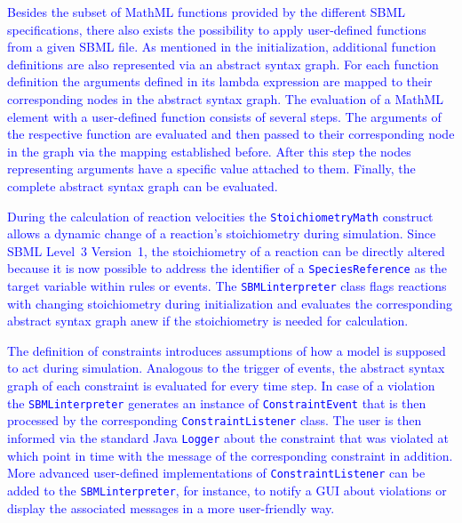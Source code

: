 \documentclass[10pt]{bmc_article}
\newenvironment{bmcformat}{\fussy\setboolean{publ}{true}}{\fussy}
\newcommand{\ConstraintEvent}             {\texttt{Constraint\-Event}\xspace}
\newcommand{\ConstraintListener}          {\texttt{Constraint\-Listener}\xspace}
\newcommand{\COR}[1]                      {\textcolor{blue}{#1}}
\newcommand{\Logger}                      {\texttt{Logger}\xspace}
\newcommand{\SBMLinterpreter}             {\texttt{SBML\-interpreter}\xspace}
\newcommand{\SpeciesReference}            {\texttt{Spe\-ci\-es\-Re\-fe\-ren\-ce}\xspace}
\newcommand{\StoichiometryMath}           {\texttt{Stoi\-chio\-metry\-Math}\xspace}
\begin{document}
\begin{bmcformat}
%
%
\COR{Besides the subset of MathML functions provided by the different \acs{SBML} specifications, there also exists the possibility to apply user-defined functions from a given \acs{SBML} file.
As mentioned in the initialization, additional function definitions are also represented via an abstract syntax graph.
For each function definition the arguments defined in its lambda expression are mapped to their corresponding nodes in the abstract syntax graph.
The evaluation of a MathML element with a user-defined function consists of several steps.
The arguments of the respective function are evaluated and then passed to their corresponding node in the graph via the mapping established before.
After this step the nodes representing arguments have a specific value attached to them.
Finally, the complete abstract syntax graph can be evaluated.}

\COR{During the calculation of reaction velocities the \StoichiometryMath construct allows a dynamic change of a reaction's stoichiometry during simulation.
Since SBML Level~3 Version~1, the stoichiometry of a reaction can be directly altered because it is now possible to address the identifier of a \SpeciesReference as the target variable within rules or events.
The \SBMLinterpreter class flags reactions with changing stoichiometry during initialization and evaluates the corresponding abstract syntax graph anew if the stoichiometry is needed for calculation.}

\COR{The definition of constraints introduces assumptions of how a model is supposed to act during simulation.
Analogous to the trigger of events, the abstract syntax graph of each constraint is evaluated for every time step.
In case of a violation the \SBMLinterpreter generates an instance of \ConstraintEvent that is then processed by the corresponding \ConstraintListener class.
The user is then informed via the standard Java \Logger about the constraint that was violated at which point in time with the message of the corresponding constraint in addition.
More advanced user-defined implementations of \ConstraintListener can be added to the \SBMLinterpreter,
for instance, to notify a \acs{GUI} about violations or display the associated messages in a more user-friendly way.}


\end{bmcformat}
\end{document}
